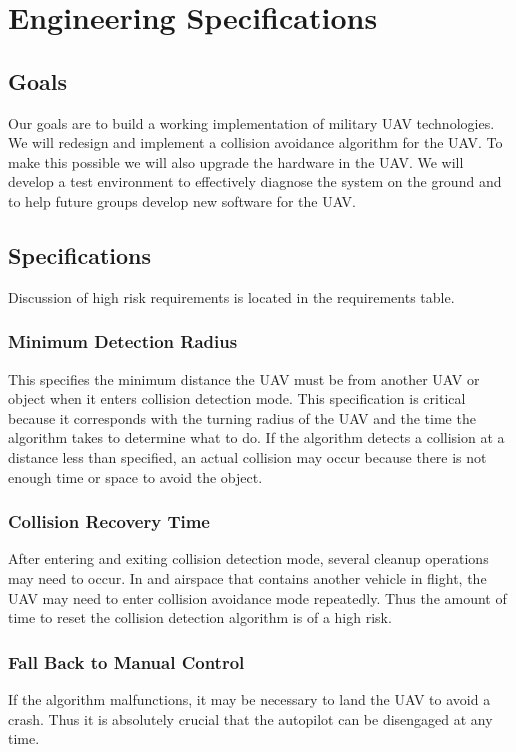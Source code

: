 \documentclass[12pt]{article}
\begin{document}
\section{Engineering Specifications}
\subsection{Goals}
Our goals are to build a working implementation of military UAV technologies. We will redesign and implement a collision avoidance algorithm for the UAV. To make this possible we will also upgrade the hardware in the UAV. We will develop a test environment to effectively diagnose the system on the ground and to help future groups develop new software for the UAV.

\subsection{Specifications}
Discussion of high risk requirements is located in the requirements table.

\subsubsection{Minimum Detection Radius}
This specifies the minimum distance the UAV must be from another UAV or object when it enters collision detection mode. This specification is critical because it corresponds with the turning radius of the UAV and the time the algorithm takes to determine  what to do. If the algorithm detects a collision at a distance less than specified, an actual collision may occur because there is not enough time or space to avoid the object.

\subsubsection{Collision Recovery Time}
After entering and exiting collision detection mode, several cleanup operations may need to occur. In and airspace that contains another vehicle in flight, the UAV may need to enter collision avoidance mode repeatedly. Thus the amount of time to reset the collision detection algorithm is of a high risk.

\subsubsection{Fall Back to Manual Control}
If the algorithm malfunctions, it may be necessary to land the UAV to avoid a crash. Thus it is absolutely crucial that the autopilot can be disengaged at any time.
\end{document}
